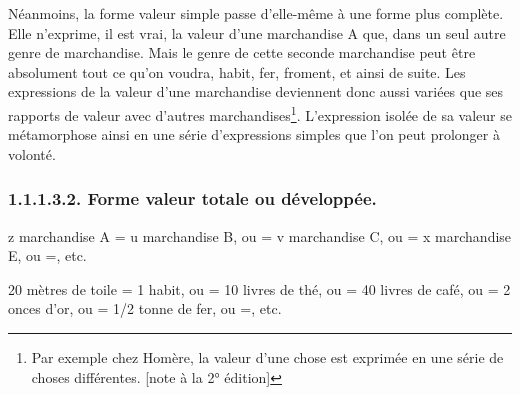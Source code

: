 \documentclass[french,twoside]{book} %
\begin{document}
Néanmoins, la forme valeur simple passe d’elle-même à une forme plus complète. Elle n’exprime, il est vrai, la valeur d’une marchandise A que, dans un seul autre genre de marchandise. Mais le genre de cette seconde marchandise peut être absolument tout ce qu’on voudra, habit, fer, froment, et ainsi de suite. Les expressions de la valeur d’une marchandise deviennent donc aussi variées que ses rapports de valeur avec d’autres marchandises\footnote{Par exemple chez Homère, la valeur d’une chose est exprimée en une série de choses différentes. [note à la 2° édition]}. L’expression isolée de sa valeur se métamorphose ainsi en une série d’expressions simples que l’on peut prolonger à volonté.
\subsubsection[{1.1.1.3.2. Forme valeur totale ou développée.}]{1.1.1.3.2. Forme valeur totale ou développée.}
\noindent z marchandise A = u marchandise B, ou = v marchandise C, ou = x marchandise E, ou =, etc.\par
20 mètres de toile = 1 habit, ou = 10 livres de thé, ou = 40 livres de café, ou = 2 onces d’or, ou = 1/2 tonne de fer, ou =, etc.\par
\end{document}
